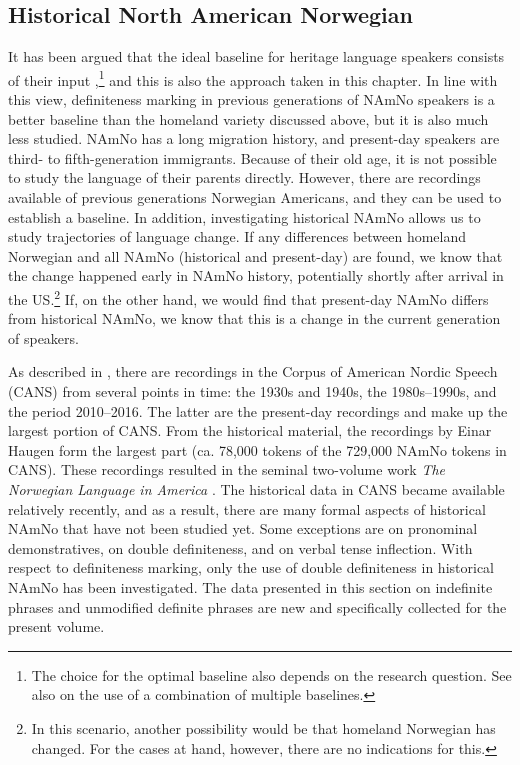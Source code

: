 \documentclass[output=paper]{langscibook}
\begin{document}
\subsection{Historical North American Norwegian} \label{Sect-HistoricalAmNo}
It has been argued that the ideal baseline for heritage language speakers consists of their input \citep[11--16]{Polinsky2018},\footnote{The choice for the optimal baseline also depends on the research question. See also \citet[chapter 6]{Aalberseetal2020} on the use of a combination of multiple baselines.} and this is also the approach taken in this chapter. In line with this view, definiteness marking in previous generations of NAmNo speakers is a better baseline than the homeland variety discussed above, but it is also much less studied. NAmNo has a long migration history, and present-day speakers are third- to fifth-generation immigrants. Because of their old age, it is not possible to study the language of their parents directly. However, there are recordings available of previous generations Norwegian Americans, and they can be used to establish a baseline. In addition, investigating historical NAmNo allows us to study trajectories of language change. If any differences between homeland Norwegian and all NAmNo (historical and present-day) are found, we know that the change happened early in NAmNo history, potentially shortly after arrival in the US.\footnote{In this scenario, another possibility would be that homeland Norwegian has changed. For the cases at hand, however, there are no indications for this.} If, on the other hand, we would find that present-day NAmNo differs from historical NAmNo, we know that this is a change in the current generation of speakers.
 
As described in , there are recordings in the Corpus of American Nordic Speech (CANS) from several points in time: the 1930s and 1940s, the 1980s--1990s, and the period 2010--2016. The latter are the present-day recordings and make up the largest portion of CANS. From the historical material, the recordings by Einar Haugen form the largest part (ca. 78,000 tokens of the 729,000 NAmNo tokens in CANS). These recordings resulted in the seminal two-volume work \textit{The Norwegian Language in America} \citep{Haugen1953}. The historical data in CANS became available relatively recently, and as a result, there are many formal aspects of historical NAmNo that have not been studied yet. Some exceptions are \citet{KinnLarsson2022} on pronominal demonstratives, \citet{vanBaal2022New} on double definiteness, and \citet{Lykke2022} on verbal tense inflection. With respect to definiteness marking, only the use of double definiteness in historical NAmNo has been investigated. The data presented in this section on indefinite phrases and unmodified definite phrases are new and specifically collected for the present volume.
 
\end{document}
